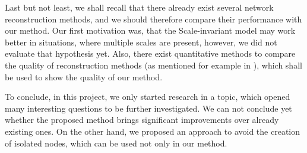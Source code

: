 Last but not least, we shall recall that there already exist several network reconstruction methods, and we should therefore compare their performance with our method. Our first motivation was, that the Scale-invariant model may work better in situations, where multiple scales are present, however, we did not evaluate that hypothesis yet. Also, there exist quantitative methods to compare the quality of reconstruction methods (as mentioned for example in \cite*{Squartini2018}), which shall be used to show the quality of our method. 

To conclude, in this project, we only started research in a topic, which opened many interesting questions to be further investigated. We can not conclude yet whether the proposed method brings significant improvements over already existing ones. On the other hand, we proposed an approach to avoid the creation of isolated nodes, which can be used not only in our method. 